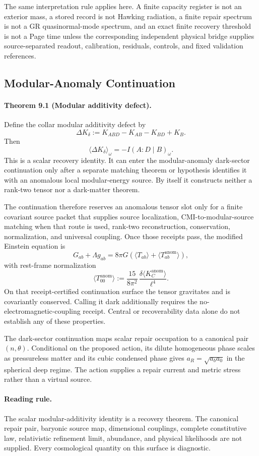 The same interpretation rule applies here. A finite capacity register is not an
exterior mass, a stored record is not Hawking radiation, a finite repair
spectrum is not a GR quasinormal-mode spectrum, and an exact finite recovery
threshold is not a Page time unless the corresponding independent physical
bridge supplies source-separated readout, calibration, residuals, controls, and
fixed validation references.

\subsection{Modular-Anomaly Continuation}

\paragraph{\textbf{Theorem 9.1 (Modular additivity defect).}}
Define the collar modular additivity defect by
\[
\Delta K_\delta:=K_{ABD}-K_{AB}-K_{BD}+K_B.
\]
Then
\[
\langle \Delta K_\delta\rangle_\omega=-I(A:D\mid B)_\omega.
\]
This is a scalar recovery identity. It can enter the modular-anomaly
dark-sector continuation only after a separate matching theorem or hypothesis
identifies it with an anomalous local modular-energy source. By itself it
constructs neither a rank-two tensor nor a dark-matter theorem.

The continuation therefore reserves an anomalous tensor slot only for a finite
covariant source packet that supplies source localization,
CMI-to-modular-source matching when that route is used, rank-two
reconstruction, conservation, normalization, and universal coupling. Once
those receipts pass, the modified Einstein equation is
\[
G_{ab}+\Lambda g_{ab}
=
8\pi G\left(\langle T_{ab}\rangle+\langle T_{ab}^{\mathrm{anom}}\rangle\right),
\]
with rest-frame normalization
\[
\langle T_{00}^{\mathrm{anom}}\rangle
:=
\frac{15}{8\pi^2}\,
\frac{\delta\langle K_C^{\mathrm{anom}}\rangle}{\ell^4}.
\]
On that receipt-certified continuation surface the tensor gravitates and is
covariantly conserved. Calling it dark additionally requires the
no-electromagnetic-coupling receipt. Central or recoverability data alone do
not establish any of these properties.

The dark-sector continuation maps scalar repair occupation to a canonical
pair \((n,\theta)\). Conditional on the proposed action, its dilute homogeneous
phase scales as pressureless matter and its cubic condensed phase gives
\(a_R=\sqrt{a_ba_0}\) in the spherical deep regime. The action supplies a
repair current and metric stress rather than a virtual source.

\paragraph{\textbf{Reading rule.}}
The scalar modular-additivity identity is a recovery theorem. The canonical
repair pair, baryonic source map, dimensional couplings, complete constitutive
law, relativistic refinement limit, abundance, and physical likelihoods are
not supplied. Every cosmological quantity on this surface is diagnostic.
